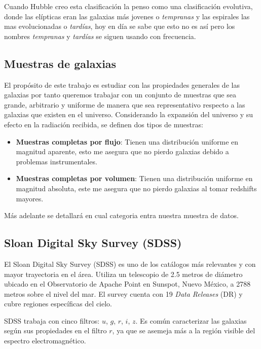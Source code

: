 \documentclass[twocolumn]{article}
\begin{document}
Cuando Hubble creo esta clasificación la penso como una clasificación evolutiva, donde las elípticas eran las galaxias más jovenes o \textit{tempranas} y las espirales las mas evolucionadas o \textit{tardías}, hoy en día se sabe que esto no es así pero los nombres \textit{tempranas} y \textit{tardías} se siguen usando con frecuencia.

\subsection{Muestras de galaxias}
El propósito de este trabajo es estudiar con las propiedades generales de las galaxias por tanto queremos trabajar con un conjunto de muestras que sea grande, arbitrario y uniforme de manera que sea representativo respecto a las galaxias que existen en el universo. Considerando la expansión del universo y su efecto en la radiación recibida, se definen dos tipos de muestras: 

\begin{itemize} 
	\item \textbf{Muestras completas por flujo}: Tienen una distribución uniforme en magnitud aparente, esto me asegura que no pierdo galaxias debido a problemas instrumentales.
    \item \textbf{Muestras completas por volumen}: Tienen una distribución uniforme en magnitud absoluta, este me asegura que no pierdo galaxias al tomar redshifts mayores.
\end{itemize}

Más adelante se detallará en cual categoria entra nuestra muestra de datos.


\subsection{Sloan Digital Sky Survey (SDSS)}

El Sloan Digital Sky Survey (SDSS) es uno de los catálogos más relevantes y con mayor trayectoria en el área. Utiliza un telescopio de 2.5 metros de diámetro ubicado en el Observatorio de Apache Point en Sunspot, Nuevo México, a 2788 metros sobre el nivel del mar. El survey cuenta con 19 \textit{Data Releases} (DR) y cubre regiones específicas del cielo.



SDSS trabaja con cinco filtros: $u$, $g$, $r$, $i$, $z$. Es común caracterizar las galaxias según sus propiedades en el filtro $r$, ya que se asemeja más a la región visible del espectro electromagnético.
\end{document}
